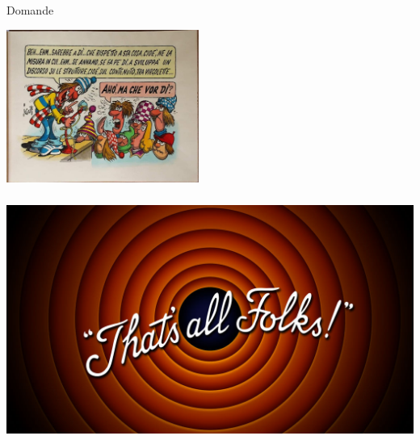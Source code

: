 \documentclass[aspectratio=169]{beamer}
\begin{document}
\begin{frame}{Domande} 
    \begin{center}
        \includegraphics[height=5cm]{domande.jpg}
    \end{center}
\end{frame}

\begin{frame}[plain]
    \begin{center}
        \includegraphics[height=8cm]{fine.jpg}
    \end{center}
\end{frame}
\end{document}
